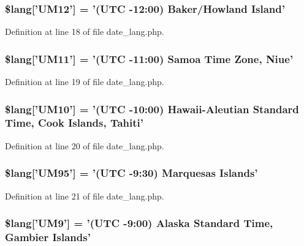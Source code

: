 \subsubsection[{\$lang}]{\setlength{\rightskip}{0pt plus 5cm}\$lang['U\-M12'] = '(U\-T\-C -\/12\-:00) Baker/Howland Island'}\label{date__lang_8php_aa03db528f49f0bdd57489a7e057a95dc}


Definition at line 18 of file date\-\_\-lang.\-php.

\subsubsection[{\$lang}]{\setlength{\rightskip}{0pt plus 5cm}\$lang['U\-M11'] = '(U\-T\-C -\/11\-:00) Samoa Time Zone, Niue'}\label{date__lang_8php_a2257b69398113162bdafb48f1bab4973}


Definition at line 19 of file date\-\_\-lang.\-php.

\subsubsection[{\$lang}]{\setlength{\rightskip}{0pt plus 5cm}\$lang['U\-M10'] = '(U\-T\-C -\/10\-:00) Hawaii-\/Aleutian Standard Time, Cook Islands, Tahiti'}\label{date__lang_8php_a671d507e120e16f7e7718be0ed0aea74}


Definition at line 20 of file date\-\_\-lang.\-php.

\subsubsection[{\$lang}]{\setlength{\rightskip}{0pt plus 5cm}\$lang['U\-M95'] = '(U\-T\-C -\/9\-:30) Marquesas Islands'}\label{date__lang_8php_a7cd7a4418ccf42c7daae2a098ba8f9e6}


Definition at line 21 of file date\-\_\-lang.\-php.

\subsubsection[{\$lang}]{\setlength{\rightskip}{0pt plus 5cm}\$lang['U\-M9'] = '(U\-T\-C -\/9\-:00) Alaska Standard Time, Gambier Islands'}\label{date__lang_8php_a5509302f8ddd971cb58e1f49f012bbac}


